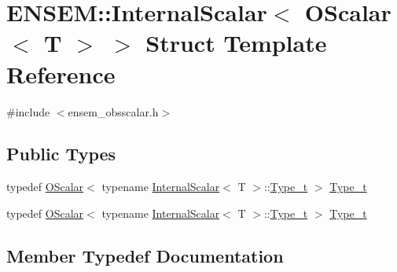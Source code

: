 \hypertarget{structENSEM_1_1InternalScalar_3_01OScalar_3_01T_01_4_01_4}{}\section{E\+N\+S\+EM\+:\+:Internal\+Scalar$<$ O\+Scalar$<$ T $>$ $>$ Struct Template Reference}
\label{structENSEM_1_1InternalScalar_3_01OScalar_3_01T_01_4_01_4}


{\ttfamily \#include $<$ensem\+\_\+obsscalar.\+h$>$}

\subsection*{Public Types}
\begin{DoxyCompactItemize}
\item 
typedef \mbox{\hyperlink{classENSEM_1_1OScalar}{O\+Scalar}}$<$ typename \mbox{\hyperlink{structENSEM_1_1InternalScalar}{Internal\+Scalar}}$<$ T $>$\+::\mbox{\hyperlink{structENSEM_1_1InternalScalar_3_01OScalar_3_01T_01_4_01_4_a9d07cdf2267bf23524d55f3626782f7c}{Type\+\_\+t}} $>$ \mbox{\hyperlink{structENSEM_1_1InternalScalar_3_01OScalar_3_01T_01_4_01_4_a9d07cdf2267bf23524d55f3626782f7c}{Type\+\_\+t}}
\item 
typedef \mbox{\hyperlink{classENSEM_1_1OScalar}{O\+Scalar}}$<$ typename \mbox{\hyperlink{structENSEM_1_1InternalScalar}{Internal\+Scalar}}$<$ T $>$\+::\mbox{\hyperlink{structENSEM_1_1InternalScalar_3_01OScalar_3_01T_01_4_01_4_a9d07cdf2267bf23524d55f3626782f7c}{Type\+\_\+t}} $>$ \mbox{\hyperlink{structENSEM_1_1InternalScalar_3_01OScalar_3_01T_01_4_01_4_a9d07cdf2267bf23524d55f3626782f7c}{Type\+\_\+t}}
\end{DoxyCompactItemize}


\subsection{Member Typedef Documentation}
\mbox{\label{structENSEM_1_1InternalScalar_3_01OScalar_3_01T_01_4_01_4_a9d07cdf2267bf23524d55f3626782f7c}} 
